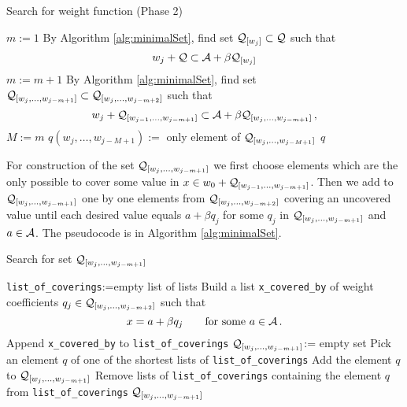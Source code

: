\begin{algorithm}
  \caption{Search for weight function (Phase 2)}
    \label{alg:weightFunction}
  \begin{algorithmic}[1]
    \STATE $m:=1$
        \STATE By Algorithm \ref{alg:minimalSet}, find set $\mathcal{Q}_{[w_j]} \subset \mathcal{Q}$ such that
          $$
          w_j + \mathcal{Q} \subset \mathcal{A} + \beta \mathcal{Q}_{[w_j]}
          $$
    \ENDFOR
        \STATE $m:= m +1$
            \STATE By Algorithm \ref{alg:minimalSet}, find set $\mathcal{Q}_{[w_j,\dots, w_{j-m+1}]} \subset \mathcal{Q}_{[w_j,\dots, w_{j-m+2}]}$ such that
              $$
              w_j + \mathcal{Q}_{[w_{j-1},\dots, w_{j-m+1}]} \subset \mathcal{A} + \beta \mathcal{Q}_{[w_j,\dots, w_{j-m+1}]}\,,
              $$
        \ENDFOR  
    \ENDWHILE  
    \STATE $M:= m$ 
        \STATE $q(w_j,\dots, w_{j-M+1}):=$ only element of $\mathcal{Q}_{[w_j,\dots, w_{j-M+1}]}$
    \ENDFOR
    \RETURN $q$
  \end{algorithmic}
\end{algorithm}
    
For construction of the set $\mathcal{Q}_{[w_j,\dots, w_{j-m+1}]}$ we first choose elements which are the only possible to cover some value in $x \in w_0 + \mathcal{Q}_{[w_{j-1},\dots, w_{j-m+1}]}$. Then we add to $\mathcal{Q}_{[w_j,\dots, w_{j-m+1}]}$ one by one elements from $\mathcal{Q}_{[w_j,\dots, w_{j-m+2}]}$ covering an uncovered value until each desired value equals $a+\beta q_j$ for some $q_j$ in $\mathcal{Q}_{[w_j,\dots, w_{j-m+1}]}$ and $a\in\mathcal{A}$. The pseudocode is in Algorithm \ref{alg:minimalSet}. 

\begin{algorithm}
  \caption{Search for set $\mathcal{Q}_{[w_j,\dots, w_{j-m+1}]}$ }
    \label{alg:minimalSet}
  \begin{algorithmic}[1]
    \STATE \verb+list_of_coverings+:=empty list of lists
        \STATE Build a list \verb+x_covered_by+ of weight coefficients $q_j \in \mathcal{Q}_{[w_j,\dots, w_{j-m+2}]}$ such that 
        $$
        x=a+ \beta q_j \qquad\text{for some } a\in\mathcal{A}\,.
        $$ 
        \vspace{-20pt}
        \STATE Append \verb+x_covered_by+ to \verb+list_of_coverings+
    \ENDFOR
    \STATE $\mathcal{Q}_{[w_j,\dots, w_{j-m+1}]}$:= empty set
        \STATE Pick an element $q$ of one of the shortest lists of \verb+list_of_coverings+ 
            \label{line:pickElement}
        \STATE Add the element $q$ to $\mathcal{Q}_{[w_j,\dots, w_{j-m+1}]}$
        \STATE Remove lists of \verb+list_of_coverings+ containing the element $q$ from \verb+list_of_coverings+
    \ENDWHILE
    \RETURN $\mathcal{Q}_{[w_j,\dots, w_{j-m+1}]}$
  \end{algorithmic}
\end{algorithm}


